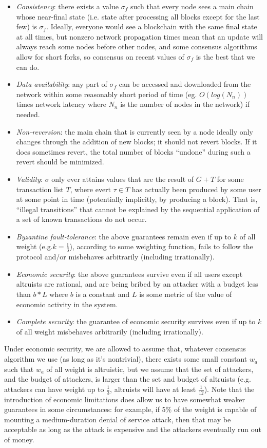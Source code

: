 \documentclass[11pt,a4paper]{article}
\makeatletter
\theoremstyle{plain}
\theoremstyle{definition}
\theoremstyle{remark}
\newcommand{\ie}{i.e.\@\xspace}
\newcommand{\eg}{e.g.\@\xspace}
\makeatother
\begin{document}
\begin{itemize}
\item
\emph{Consistency}: there exists a value $\sigma_f$ such that every node sees a main chain whose near-final state (\ie state after processing all blocks except for the last few) is $\sigma_f$. Ideally, everyone would see a blockchain with the same final state at all times, but nonzero network propagation times mean that an update will always reach some nodes before other nodes, and some consensus algorithms allow for short forks, so consensus on recent values of $\sigma_f$ is the best that we can do.
\item
\emph{Data availability}: any part of $\sigma_f$ can be accessed and downloaded from the network within some reasonably short period of time (eg. $O(log(N_n))$ times network latency where $N_n$ is the number of nodes in the network) if needed.
\item
\emph{Non-reversion}: the main chain that is currently seen by a node ideally only changes through the addition of new blocks; it should not revert blocks. If it does sometimes revert, the total number of blocks  ``undone'' during such a revert should be minimized.
\item
\emph{Validity}: $\sigma$ only ever attains values that are the result of $G + T$ for some transaction list $T$, where evert $\tau \in T$ has actually been produced by some user at some point in time (potentially implicitly, by producing a block). That is, ``illegal transitions'' that cannot be explained by the sequential application of a set of known transactions do not occur.
\item
\emph{Byzantine fault-tolerance}: the above guarantees remain even if up to $k$ of all weight (\eg $k = \frac{1}{3}$), according to some weighting function, fails to follow the protocol and/or misbehaves arbitrarily (including irrationally).
\item
\emph{Economic security}: the above guarantees survive even if all users except altruists are rational, and are being bribed by an attacker with a budget less than $b * L$ where $b$ is a constant and $L$ is some metric of the value of economic activity in the system.
\item
\emph{Complete security}: the guarantee of economic security survives even if up to $k$ of all weight misbehaves arbitrarily (including irrationally).
\end{itemize}

Under economic security, we are allowed to assume that, whatever consensus algorithm we use (as long as it's nontrivial), there exists some small constant $w_a$ such that $w_a$ of all weight is altruistic, but we assume that the set of attackers, and the budget of attackers, is larger than the set and budget of altruists (\eg attackers can have weight up to $\frac{1}{3}$, altruists will have at least $\frac{1}{12}$). Note that the introduction of economic limitations does allow us to have somewhat weaker guarantees in some circumstances: for example, if 5\% of the weight is capable of mounting a medium-duration denial of service attack, then that may be acceptable as long as the attack is expensive and the attackers eventually run out of money.
\end{document}
